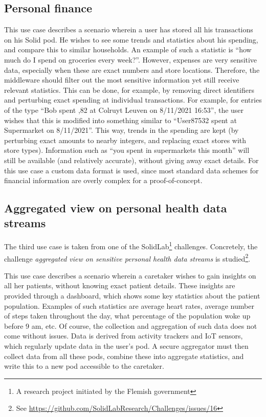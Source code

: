 \subsection{Personal finance}
\label{usecase:personal-finance}
This use case describes a scenario wherein a user has stored all his transactions on his Solid pod. He wishes to see some trends and statistics about his spending, and compare this to similar households. An example of such a statistic is ``how much do I spend on groceries every week?''.  However, expenses are very sensitive data, especially when these are exact numbers and store locations. Therefore, the middleware should filter out the most sensitive information yet still receive relevant statistics. This can be done, for example, by removing direct identifiers and perturbing exact spending at individual transactions. For example, for entries of the type ``Bob spent ,82 at Colruyt Leuven on 8/11/2021 16:53'', the user wishes that this is modified into something similar to ``User87532 spent  at Supermarket on 8/11/2021''. This way, trends in the spending are kept (by perturbing exact amounts to nearby integers, and replacing exact stores with store types). Information such as ``you spent  in supermarkets this month'' will still be available (and relatively accurate), without giving away exact details. For this use case a custom data format is used, since most standard data schemes for financial information are overly complex for a proof-of-concept.

\subsection{Aggregated view on personal health data streams}
The third use case is taken from one of the SolidLab\footnote{A research project initiated by the Flemish government } challenges. Concretely, the challenge \textit{aggregated view on sensitive personal health data streams} is studied\footnote{See \url{https://github.com/SolidLabResearch/Challenges/issues/16}}.

This use case describes a scenario wherein a caretaker wishes to gain insights on all her patients, without knowing exact patient details. These insights are provided through a dashboard, which shows some key statistics about the patient population. Examples of such statistics are average heart rates, average number of steps taken throughout the day, what percentage of the population woke up before 9 am, etc. Of course, the collection and aggregation of such data does not come without issues. Data is derived from activity trackers and IoT sensors, which regularly update data in the user's pod. A secure aggregator must then collect data from all these pods, combine these into aggregate statistics, and write this to a new pod accessible to the caretaker.

